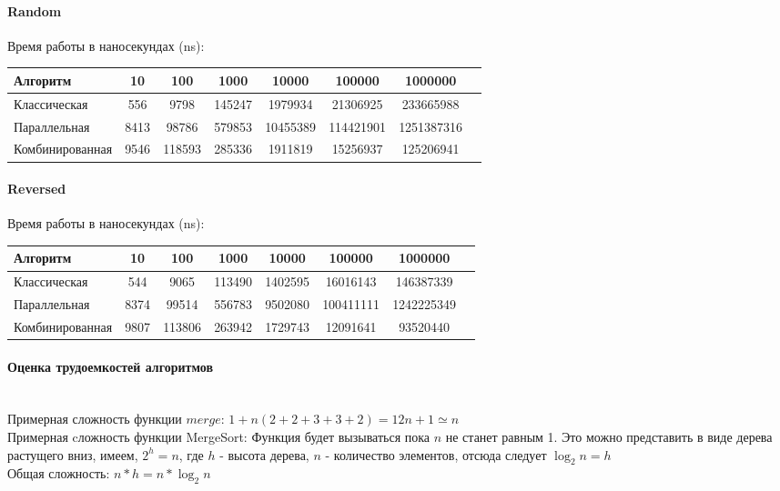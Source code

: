 \documentclass[utf8x, 12pt]{G7-32} %
\begin{document}
\begin{flushleft}
	\paragraph{Random}
\end{flushleft}

Время работы в наносекундах (ns):\\
\begin{tabular}{l*{6}{c}r}
	Алгоритм & 10 & 100 & 1000 & 10000 & 100000 & 1000000 \\
	\hline
	Классическая & 556 & 9798 & 145247 & 1979934 & 21306925 & 233665988 \\
	Параллельная & 8413 & 98786 & 579853 & 10455389 & 114421901 & 1251387316 \\
	Комбинированная & 9546 & 118593 & 285336 & 1911819 & 15256937 & 125206941 \\
\end{tabular}

\begin{flushleft}
	\paragraph{Reversed}
\end{flushleft}

Время работы в наносекундах (ns):\\
\begin{tabular}{l*{6}{c}r}
	Алгоритм & 10 & 100 & 1000 & 10000 & 100000 & 1000000 \\
	\hline
	Классическая & 544 & 9065 & 113490 & 1402595 & 16016143 & 146387339 \\
	Параллельная & 8374 & 99514 & 556783 & 9502080 & 100411111 & 1242225349 \\
	Комбинированная & 9807 & 113806 & 263942 & 1729743 & 12091641 & 93520440 \\
\end{tabular}

\newpage

\paragraph{Оценка трудоемкостей алгоритмов}
\\
Примерная сложность функции $merge$: $1 + n(2 + 2 + 3 + 3 + 2) = 12n + 1 \simeq n$\\
Примерная cложность функции MergeSort: Функция будет вызываться пока $n$ не станет равным 1. Это можно представить в виде дерева растущего вниз, имеем, $2^h = n$, где $h$ - высота дерева, $n$ - количество элементов, отсюда следует $\log_2 n = h$\\
Общая сложность: $n * h = n * \log_2 n$
\end{document}
